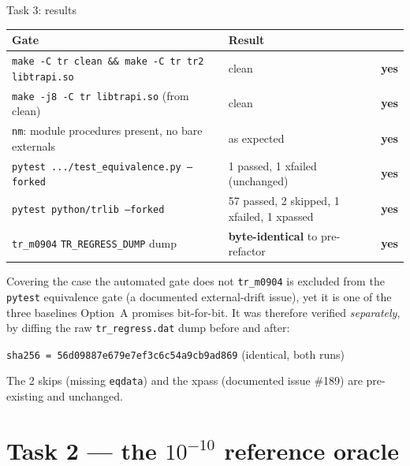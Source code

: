 \documentclass[10pt,aspectratio=169]{beamer}
\newcommand{\C}[1]{\texttt{\small #1}}          %
\newcommand{\yes}{\textcolor{ok}{\textbf{yes}}}
\begin{document}
\begin{frame}{Task 3: results}

\begin{center}
\small
\begin{tabular}{@{}llc@{}}
\toprule
Gate & Result & \\
\midrule
\C{make -C tr clean \&\& make -C tr tr2 libtrapi.so} & clean & \yes \\
\C{make -j8 -C tr libtrapi.so} (from clean)     & clean & \yes \\
\C{nm}: module procedures present, no bare externals & as expected & \yes \\
\C{pytest .../test\_equivalence.py --forked}   & 1 passed, 1 xfailed (unchanged) & \yes \\
\C{pytest python/trlib --forked}               & 57 passed, 2 skipped, 1 xfailed, 1 xpassed & \yes \\
\C{tr\_m0904} \C{TR\_REGRESS\_DUMP} dump        & \textbf{byte-identical} to pre-refactor & \yes \\
\bottomrule
\end{tabular}
\end{center}

\vspace{0.5em}
\begin{block}{Covering the case the automated gate does not}
\C{tr\_m0904} is excluded from the \C{pytest} equivalence gate (a documented external-drift issue), yet it is
one of the three baselines Option~A promises bit-for-bit. It was therefore verified \emph{separately}, by
diffing the raw \C{tr\_regress.dat} dump before and after:

\medskip
\centerline{\C{sha256 = 56d09887e679e7ef3c6c54a9cb9ad869} \quad (identical, both runs)}
\end{block}

\vspace{0.2em}
\footnotesize
The 2 skips (missing \C{eqdata}) and the xpass (documented issue \#189) are pre-existing and unchanged.
\end{frame}

\section{Task 2 --- the $10^{-10}$ reference oracle}
\end{document}
